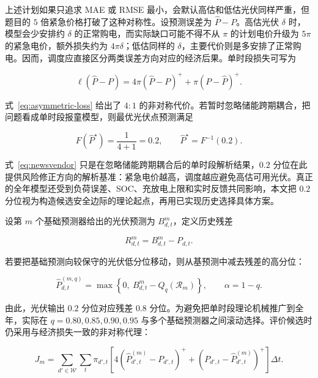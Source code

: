 上述计划如果只追求 MAE 或 RMSE 最小，会默认高估和低估光伏同样严重，但题目的 $5$ 倍紧急价格打破了这种对称性。设预测误差为 $\hat P-P$。高估光伏 $\delta$ 时，模型会少安排约 $\delta$ 的正常购电，而实际缺口可能不得不从 $\pi$ 的计划电价升级为 $5\pi$ 的紧急电价，额外损失约为 $4\pi\delta$；低估同样的 $\delta$，主要代价则是多安排了正常购电。因而，调度应直接区分两类误差方向对应的经济后果。单时段损失可写为

\begin{equation}
    \ell(\hat P-P)=4\pi(\hat P-P)^++\pi(P-\hat P)^+ .
    \label{eq:asymmetric-loss}
\end{equation}

式~\eqref{eq:asymmetric-loss} 给出了 $4{:}1$ 的非对称代价。若暂时忽略储能跨期耦合，把问题看成单时段报童模型，则最优光伏点预测满足 \cite{qin2011newsvendor,polat2024renewable}

\begin{equation}
    F(\hat P^\star)=\frac{1}{4+1}=0.2,
    \qquad \hat P^\star=F^{-1}(0.2).
    \label{eq:newsvendor}
\end{equation}

式~\eqref{eq:newsvendor} 只是在忽略储能跨期耦合后的单时段解析结果，$0.2$ 分位在此提供风险修正方向的解析基准：紧急电价越高，调度越应避免高估可用光伏。真正的全年模型还受到负荷误差、SOC、充放电上限和实时反馈共同影响，本文把 $0.2$ 分位视为构造候选安全边际的理论起点，再用已实现历史选择具体方案。

设第 $m$ 个基础预测器给出的光伏预测为 $B^m_{d,t}$，定义历史残差

\begin{equation}
    R^m_{d,t}=B^m_{d,t}-P_{d,t}.
    \label{eq:pv-residual}
\end{equation}

若要把基础预测向较保守的光伏低分位移动，则从基预测中减去残差的高分位：

\begin{equation}
    \hat P^{(m,q)}_{d,t}=\max\left\{0,\ B^m_{d,t}-Q_q(\mathcal R_m)\right\},
    \qquad \alpha=1-q.
    \label{eq:pv-forecast}
\end{equation}

由此，光伏输出 $0.2$ 分位对应残差 $0.8$ 分位。为避免把单时段理论机械推广到全年，实际在 $q=0.80,0.85,0.90,0.95$ 与多个基础预测器之间滚动选择。评价候选时仍采用与经济损失一致的非对称代理：

\begin{equation}
    J_m=\sum_{d'\in\mathcal W}\sum_t\pi_{d',t}\left[
    4(\hat P^{(m)}_{d',t}-P_{d',t})^+
    +(P_{d',t}-\hat P^{(m)}_{d',t})^+\right]\Delta t .
    \label{eq:pv-score}
\end{equation}

